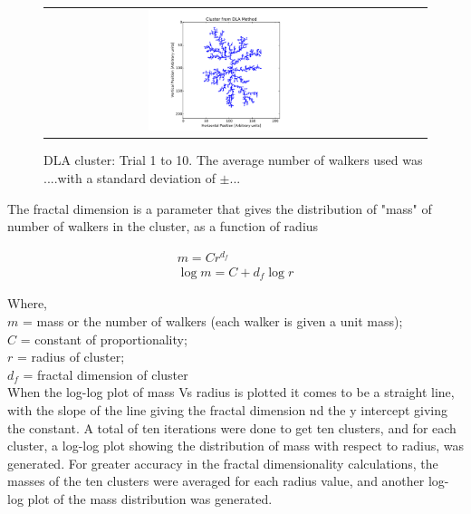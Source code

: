 \documentclass[a4paper,12pt]{article}
\begin{document}
\begin{figure}[htb]
\begin{tabular}{@{}cc@{}}
		\includegraphics[width = 0.45\textwidth]{pics/DLA_crystal_final_10.pdf} \\
	\end{tabular}
	\caption{DLA cluster: Trial 1 to 10. The average number of walkers used was ....with a standard deviation of $\pm...$}
	\label{DLAcluster}
\end{figure}


\indent The fractal dimension is a parameter that gives the distribution of "mass" of number of walkers in the cluster, as a function of radius

\begin{eqnarray}	
	m = C r^{d_f} \\
	\log{m} = C + d_f\log{r}
\end{eqnarray}\label{fractal dimension}


Where, \\
$m$ = mass or the number of walkers (each walker is given a unit mass);\\
$C$ = constant of proportionality; \\
$r$ = radius of cluster; \\
$d_f$ = fractal dimension of cluster \\

\indent When the log-log plot of mass Vs radius is plotted it comes to be a straight line, with the slope of the line giving the fractal dimension nd the y intercept giving the constant. 
A total of ten iterations were done to get ten clusters, and for each cluster, a log-log plot showing the distribution of mass with respect to radius, was generated. For greater accuracy in the fractal dimensionality
calculations, the masses of the ten clusters were averaged for each radius value, and another log-log plot of the mass distribution was generated.
\end{document}
